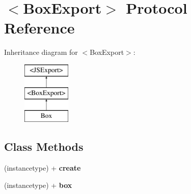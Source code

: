 \hypertarget{protocol_box_export-p}{}\section{$<$Box\+Export$>$ Protocol Reference}
\label{protocol_box_export-p}
Inheritance diagram for $<$Box\+Export$>$\+:\begin{figure}[H]
\begin{center}
\leavevmode
\includegraphics[height=3.000000cm]{protocol_box_export-p}
\end{center}
\end{figure}
\subsection*{Class Methods}
\begin{DoxyCompactItemize}
\item 
\hypertarget{protocol_box_export-p_a38d3fd2eacf651a37a87f61e43c77b5c}{}(instancetype) + {\bfseries create}\label{protocol_box_export-p_a38d3fd2eacf651a37a87f61e43c77b5c}

\item 
\hypertarget{protocol_box_export-p_a4a28a9bd08b253543cd0c0e06dabbb5e}{}(instancetype) + {\bfseries box}\label{protocol_box_export-p_a4a28a9bd08b253543cd0c0e06dabbb5e}

\end{DoxyCompactItemize}
